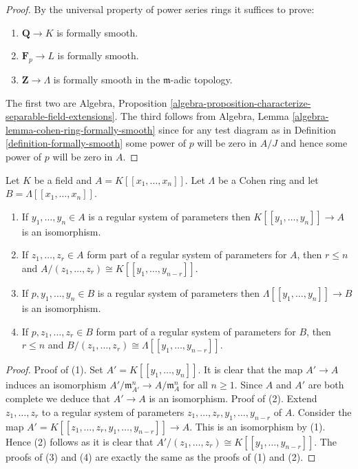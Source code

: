 \begin{proof}
By the universal property of power series rings it suffices to prove:
\begin{enumerate}
\item $\mathbf{Q} \to K$ is formally smooth.
\item $\mathbf{F}_p \to L$ is formally smooth.
\item $\mathbf{Z} \to \Lambda$ is formally smooth in the
$\mathfrak m$-adic topology.
\end{enumerate}
The first two are
Algebra, Proposition
\ref{algebra-proposition-characterize-separable-field-extensions}.
The third follows from
Algebra, Lemma \ref{algebra-lemma-cohen-ring-formally-smooth}
since for any test diagram as in Definition \ref{definition-formally-smooth}
some power of $p$ will be zero in $A/J$ and hence some power of $p$ will
be zero in $A$.
\end{proof}

\begin{lemma}
\label{lemma-quotient-power-series-ring-over-Cohen}
Let $K$ be a field and $A = K[[x_1, \ldots, x_n]]$.
Let $\Lambda$ be a Cohen ring and let $B = \Lambda[[x_1, \ldots, x_n]]$.
\begin{enumerate}
\item If $y_1, \ldots, y_n \in A$ is a regular system of parameters
then $K[[y_1, \ldots, y_n]] \to A$ is an isomorphism.
\item If $z_1, \ldots, z_r \in A$ form part of a regular system of
parameters for $A$, then $r \leq n$ and
$A/(z_1, \ldots, z_r) \cong K[[y_1, \ldots, y_{n - r}]]$.
\item If $p, y_1, \ldots, y_n \in B$ is a regular system of parameters
then $\Lambda[[y_1, \ldots, y_n]] \to B$ is an isomorphism.
\item If $p, z_1, \ldots, z_r \in B$ form part of a regular system of
parameters for $B$, then $r \leq n$ and
$B/(z_1, \ldots, z_r) \cong \Lambda[[y_1, \ldots, y_{n - r}]]$.
\end{enumerate}
\end{lemma}

\begin{proof}
Proof of (1). Set $A' = K[[y_1, \ldots, y_n]]$. It is clear that
the map $A' \to A$ induces an isomorphism
$A'/\mathfrak m_{A'}^n \to A/\mathfrak m_A^n$ for all $n \geq 1$.
Since $A$ and $A'$ are both complete we deduce that $A' \to A$ is an
isomorphism.
Proof of (2). Extend $z_1, \ldots, z_r$ to a regular system of parameters
$z_1, \ldots, z_r, y_1, \ldots, y_{n - r}$ of $A$. Consider the map
$A' = K[[z_1, \ldots, z_r, y_1, \ldots, y_{n - r}]] \to A$.
This is an isomorphism by (1). Hence (2) follows as it is clear that
$A'/(z_1, \ldots, z_r) \cong K[[y_1, \ldots, y_{n - r}]]$.
The proofs of (3) and (4) are exactly the same as the proofs of (1) and (2).
\end{proof}

